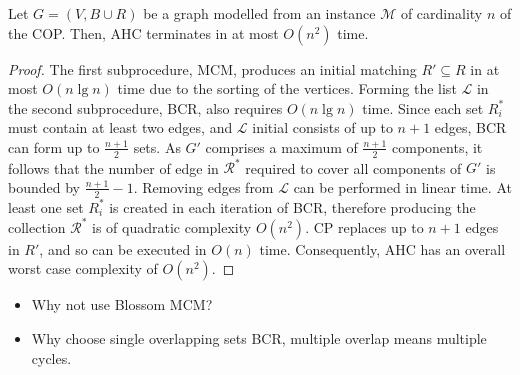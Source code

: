 \documentclass[authoryear]{elsarticle}
\begin{document}
\begin{theorem}
	\label{thm:ahc}
	Let $G=(V, B \cup R)$ be a graph modelled from an instance $\mathcal{M}$ of cardinality $n$ of the COP. Then, AHC terminates in at most $O(n^2)$ time.
\end{theorem}

\begin{proof}
	The first subprocedure, MCM, produces an initial matching $R' \subseteq R$ in at most $O(n \lg n)$ time due to the sorting of the vertices. Forming the list $\mathcal{L}$ in the second subprocedure, BCR, also requires $O(n \lg n)$ time. Since each set $R^*_i$ must contain at least two edges, and $\mathcal{L}$ initial consists of up to $n+1$ edges, BCR can form up to $\frac{n+1}{2}$ sets. As $G'$ comprises a maximum of $\frac{n+1}{2}$ components, it follows that the number of edge in $\mathcal{R}^*$ required to cover all components of $G'$  is bounded by $\frac{n+1}{2}-1$. Removing edges from $\mathcal{L}$ can be performed in linear time. At least one set $R^*_i$ is created in each iteration of BCR, therefore producing the collection $\mathcal{R}^*$ is of quadratic complexity $O(n^2)$. CP replaces up to $n+1$ edges in $R'$, and so can be executed in $O(n)$ time. Consequently, AHC has an overall worst case complexity of $O(n^2)$.
\end{proof}	

{\color{myBlue}
\begin{itemize}[leftmargin=*]
	\item Why not use Blossom MCM?
	\item Why choose single overlapping sets BCR, multiple overlap means multiple cycles.
\end{itemize}
}

\end{document}
